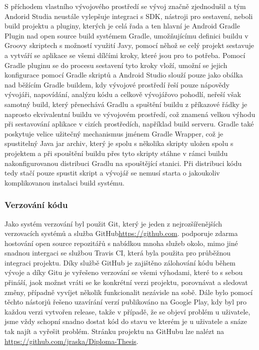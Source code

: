 \documentclass{article}
\begin{document}
S příchodem vlastního vývojového prostředí se vývoj značně zjednodušil a tým Andorid Studia neustále vylepšuje integraci s SDK,
nástroji pro sestavení, neboli build projektu a pluginy, kterých je celá řada a ten hlavní je Android Gradle Plugin
nad open source build systémem Gradle, umožňujícímu definici buildu v Groovy skriptech s možností využití Javy,
 pomocí něhož se celý projekt sestavuje a vytváří se aplikace se všemi dílčími kroky, které jsou pro to potřeba.
Pomocí Gradle pluginu se do procesu sestavení tyto kroky vloží, umožní se jejich konfigurace pomocí Gradle skriptů
a Android Studio slouží pouze jako obálka nad běžícím Gradle buildem, kdy vývojové prostředí řeší pouze nápovědy vývojáři,
napovídání, analýzu kódu a celkově vývojářovo pohodlí, neřeší však samotný build, který přenechává Gradlu a spuštění buildu
 z příkazové řádky je naprosto ekvivalentní buildu ve vývojovém prostředí, což znamená velkou výhodu při sestavování aplikace
 v cizích prostředích, například build serveru.
 Gradle také poskytuje velice užitečný mechanismus jménem Gradle Wrapper, což je spustitelný Java jar archiv,
 který je spolu s několika skripty uložen spolu s projektem a při spouštění buildu přes tyto skripty stáhne v rámci
 buildu nakonfigurovanou distribuci Gradlu na spouštějící stanici. Při distribuci kódu tedy stačí pouze spustit
 skript a vývojář se nemusí starta o jakoukoliv komplikovanou instalaci build systému.

 \subsubsection{Verzování kódu}
 Jako systém verzování byl použit Git, který je jeden z nejrozšířenějších verzovacích systémů a služba GitHub\url{https://github.com}.
 podporuje zdarma hostování open source repozitářů s nabídkou mnoha služeb okolo, mimo jiné snadnou intergaci se službou
 Travis CI, která byla použita pro průběžnou integraci projektu. Díky službě GitHub je zajištěno zálohování kódu
 během vývoje a díky Gitu je vyřešeno verzování se všemi výhodami, které to s sebou přináší, jaok možnst vráti se
 ke konkrétní verzi projektu, porovnávat a sledovat změny, případně vyvíjet několik funkcionalit nezávisle na sobě.
 Dále bylo pomocí těchto nástorjů řešeno uzavírání verzí publikováno na Google Play, kdy byl pro každou verzi vytvořen
 release, takže v případě, že se objeví problém u uživatele, jsme vždy schopní snadno dostat kód do stavu
 ve kterém je u uživatele a snáze tak najít a vyřešit problém. Stránku projektu na GitHubu lze nalézt na
 \url{https://github.com/jraska/Diploma-Thesis}.
\end{document}
